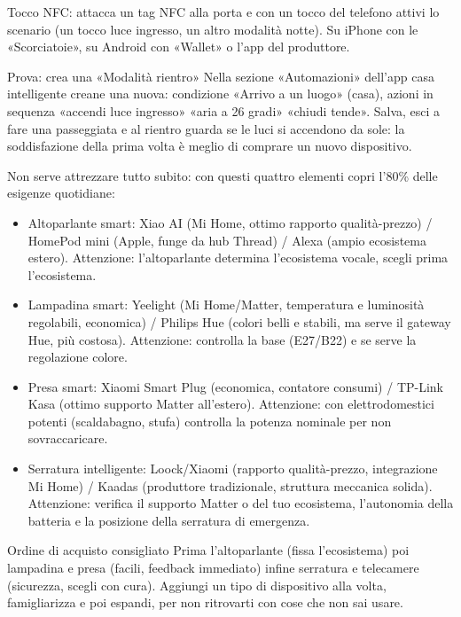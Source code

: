 Tocco NFC: attacca un tag NFC alla porta e con un tocco del telefono attivi lo scenario (un tocco luce ingresso, un altro modalità notte). Su iPhone con le «Scorciatoie», su Android con «Wallet» o l'app del produttore.

\begin{tcbpractice}{Prova: crea una «Modalità rientro»}
Nella sezione «Automazioni» dell'app casa intelligente creane una nuova: condizione «Arrivo a un luogo» (casa), azioni in sequenza «accendi luce ingresso» «aria a 26 gradi» «chiudi tende». Salva, esci a fare una passeggiata e al rientro guarda se le luci si accendono da sole: la soddisfazione della prima volta è meglio di comprare un nuovo dispositivo.

\end{tcbpractice}


Non serve attrezzare tutto subito: con questi quattro elementi copri l'80\% delle esigenze quotidiane:

\begin{itemize}
  \item Altoparlante smart: Xiao AI (Mi Home, ottimo rapporto qualità-prezzo) / HomePod mini (Apple, funge da hub Thread) / Alexa (ampio ecosistema estero). Attenzione: l'altoparlante determina l'ecosistema vocale, scegli prima l'ecosistema.
  \item Lampadina smart: Yeelight (Mi Home/Matter, temperatura e luminosità regolabili, economica) / Philips Hue (colori belli e stabili, ma serve il gateway Hue, più costosa). Attenzione: controlla la base (E27/B22) e se serve la regolazione colore.
  \item Presa smart: Xiaomi Smart Plug (economica, contatore consumi) / TP-Link Kasa (ottimo supporto Matter all'estero). Attenzione: con elettrodomestici potenti (scaldabagno, stufa) controlla la potenza nominale per non sovraccaricare.
  \item Serratura intelligente: Loock/Xiaomi (rapporto qualità-prezzo, integrazione Mi Home) / Kaadas (produttore tradizionale, struttura meccanica solida). Attenzione: verifica il supporto Matter o del tuo ecosistema, l'autonomia della batteria e la posizione della serratura di emergenza.
\end{itemize}

\begin{tcbinfo}{Ordine di acquisto consigliato}
Prima l'altoparlante (fissa l'ecosistema) poi lampadina e presa (facili, feedback immediato) infine serratura e telecamere (sicurezza, scegli con cura). Aggiungi un tipo di dispositivo alla volta, famigliarizza e poi espandi, per non ritrovarti con cose che non sai usare.

\end{tcbinfo}

